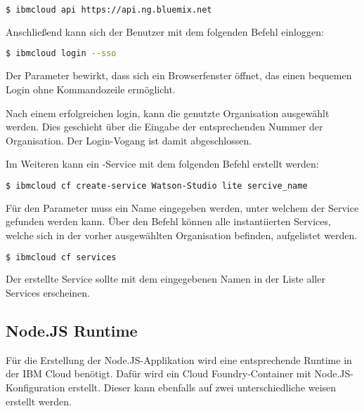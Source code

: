 \begin{lstlisting}[language=bash, caption=Setzen des API Targets, label=Setzen des API Targets]
    $ ibmcloud api https://api.ng.bluemix.net
\end{lstlisting}

Anschließend kann sich der Benutzer mit dem folgenden Befehl einloggen:

\begin{lstlisting}[language=bash, caption=Login über CLI und Single Sign-on, label=Login über CLI und SSO]
    $ ibmcloud login --sso
\end{lstlisting}

Der Parameter  bewirkt, dass sich ein Browserfenster öffnet, das einen bequemen Login ohne Kommandozeile
ermöglicht.

Nach einem erfolgreichen login, kann die genutzte Organisation ausgewählt werden. Dies geschieht über die Eingabe der
entsprechenden Nummer der Organisation. Der Login-Vogang ist damit abgeschlossen.

Im Weiteren kann ein -Service mit dem folgenden Befehl erstellt werden:

\begin{lstlisting}[language=bash, caption=Instanziierung des Watson Studio Services, label=Instanziierung des Watson Studio Services]
    $ ibmcloud cf create-service Watson-Studio lite sercive_name
\end{lstlisting}

Für den Parameter  muss ein Name eingegeben werden, unter welchem der Service gefunden werden kann.
Über den Befehl  können alle instantiierten Services, welche sich in der vorher ausgewählten Organisation
befinden, aufgelistet werden.

\begin{lstlisting}[language=bash, caption=Auflisten aller Services, label=Auflisten aller Services]
    $ ibmcloud cf services
\end{lstlisting}

Der erstellte Service sollte mit dem eingegebenen Namen in der Liste aller Services erscheinen.

\subsection{Node.JS Runtime}
\label{ssc:nodejs_runtime}
Für die Erstellung der Node.JS-Applikation wird eine entsprechende Runtime in der IBM Cloud benötigt. Dafür wird ein
Cloud Foundry-Container mit Node.JS-Konfiguration erstellt. Dieser kann ebenfalls auf zwei unterschiedliche weisen erstellt
werden.

